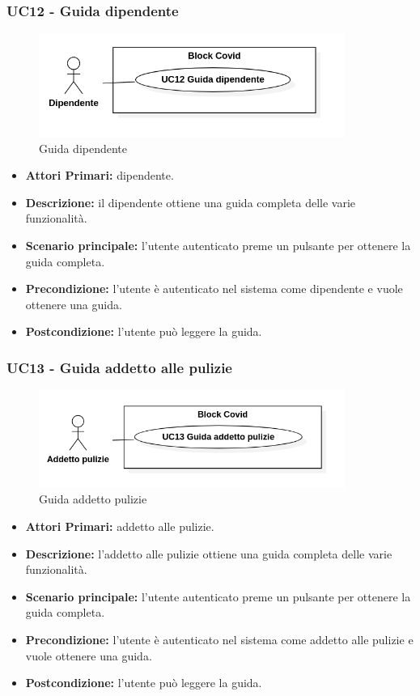 \subsubsection{ UC12 - Guida dipendente}
\begin{figure}[H]
	\centering
	\includegraphics[width=10cm]{res/images/UC12.png}
	\caption{Guida dipendente}
\end{figure}
\begin{itemize}
	\item\textbf{Attori Primari:} 
	dipendente.
	\item\textbf{Descrizione:} 
	il dipendente ottiene una guida completa delle varie funzionalità.
	\item\textbf{Scenario principale:} 
	l'utente autenticato preme un pulsante per ottenere la guida completa.
	\item\textbf{Precondizione:} 
	l'utente è autenticato nel sistema come dipendente e vuole ottenere una guida.
	\item\textbf{Postcondizione:}
	l'utente può leggere la guida.
\end{itemize}

\subsubsection{ UC13 - Guida addetto alle pulizie}
\begin{figure}[H]
	\centering
	\includegraphics[width=10cm]{res/images/UC13.png}
	\caption{Guida addetto pulizie}
\end{figure}
\begin{itemize}
	\item\textbf{Attori Primari:} 
	addetto alle pulizie.
	\item\textbf{Descrizione:} 
	l'addetto alle pulizie ottiene una guida completa delle varie funzionalità.
	\item\textbf{Scenario principale:} 
	l'utente autenticato preme un pulsante per ottenere la guida completa.
	\item\textbf{Precondizione:} 
	l'utente è autenticato nel sistema come addetto alle pulizie e vuole ottenere una guida.
	\item\textbf{Postcondizione:}
	l'utente può leggere la guida.
\end{itemize}

